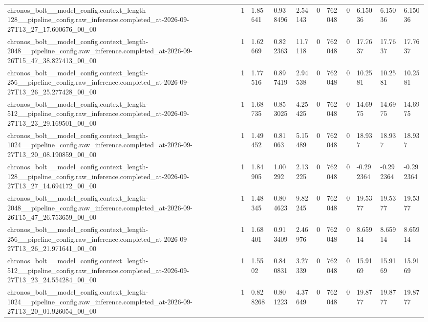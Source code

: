 \begin{tabular}{lllllllllll}
chronos\_bolt\_\_model\_config.context\_length-128\_\_pipeline\_config.raw\_inference.completed\_at-2026-09-27T13\_27\_17.600676\_00\_00 & 1 & 1.85641 & 0.938496 & 2.54143 & 0 & 762048 & 0 & 6.15036 & 6.15036 & 6.15036 \\
chronos\_bolt\_\_model\_config.context\_length-2048\_\_pipeline\_config.raw\_inference.completed\_at-2026-09-26T15\_47\_38.827413\_00\_00 & 1 & 1.62669 & 0.822363 & 11.7118 & 0 & 762048 & 0 & 17.7637 & 17.7637 & 17.7637 \\
chronos\_bolt\_\_model\_config.context\_length-256\_\_pipeline\_config.raw\_inference.completed\_at-2026-09-27T13\_26\_25.277428\_00\_00 & 1 & 1.77516 & 0.897419 & 2.94538 & 0 & 762048 & 0 & 10.2581 & 10.2581 & 10.2581 \\
chronos\_bolt\_\_model\_config.context\_length-512\_\_pipeline\_config.raw\_inference.completed\_at-2026-09-27T13\_23\_29.169501\_00\_00 & 1 & 1.68735 & 0.853025 & 4.25425 & 0 & 762048 & 0 & 14.6975 & 14.6975 & 14.6975 \\
chronos\_bolt\_\_model\_config.context\_length-1024\_\_pipeline\_config.raw\_inference.completed\_at-2026-09-27T13\_20\_08.190859\_00\_00 & 1 & 1.49452 & 0.81063 & 5.15489 & 0 & 762048 & 0 & 18.937 & 18.937 & 18.937 \\
chronos\_bolt\_\_model\_config.context\_length-128\_\_pipeline\_config.raw\_inference.completed\_at-2026-09-27T13\_27\_14.694172\_00\_00 & 1 & 1.84905 & 1.00292 & 2.13225 & 0 & 762048 & 0 & -0.292364 & -0.292364 & -0.292364 \\
chronos\_bolt\_\_model\_config.context\_length-2048\_\_pipeline\_config.raw\_inference.completed\_at-2026-09-26T15\_47\_26.753659\_00\_00 & 1 & 1.48345 & 0.804623 & 9.82245 & 0 & 762048 & 0 & 19.5377 & 19.5377 & 19.5377 \\
chronos\_bolt\_\_model\_config.context\_length-256\_\_pipeline\_config.raw\_inference.completed\_at-2026-09-27T13\_26\_21.971641\_00\_00 & 1 & 1.68401 & 0.913409 & 2.46976 & 0 & 762048 & 0 & 8.65914 & 8.65914 & 8.65914 \\
chronos\_bolt\_\_model\_config.context\_length-512\_\_pipeline\_config.raw\_inference.completed\_at-2026-09-27T13\_23\_24.554284\_00\_00 & 1 & 1.5502 & 0.840831 & 3.27339 & 0 & 762048 & 0 & 15.9169 & 15.9169 & 15.9169 \\
chronos\_bolt\_\_model\_config.context\_length-1024\_\_pipeline\_config.raw\_inference.completed\_at-2026-09-27T13\_20\_01.926054\_00\_00 & 1 & 0.828268 & 0.801223 & 4.37649 & 0 & 762048 & 0 & 19.8777 & 19.8777 & 19.8777 \\

\end{tabular}
